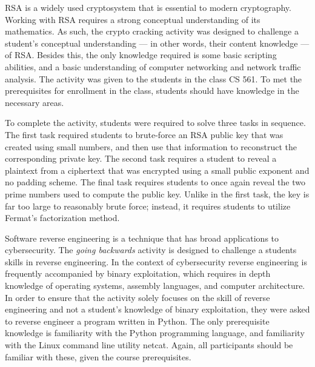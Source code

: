     RSA is a widely used cryptosystem that is essential to modern cryptography. 
    Working with RSA requires a strong conceptual understanding of its mathematics. 
    As such, the crypto cracking activity was designed to challenge a student's conceptual understanding --- 
    in other words, their content knowledge --- 
    of RSA. 
    Besides this, the only knowledge required is some basic scripting abilities, and a basic understanding of computer networking and network traffic analysis. 
    The activity was given to the students in the class CS 561. 
    To met the prerequisites for enrollment in the class, students should have knowledge in the necessary areas. 


    To complete the activity, students were required to solve three tasks in sequence. 
    The first task required students to brute-force an RSA public key that was created using small numbers, and then use that information to reconstruct the corresponding private key. 
    The second task requires a student to reveal a plaintext from a ciphertext that was encrypted using a small public exponent and no padding scheme. 
    The final task requires students to once again reveal the two prime numbers used to compute the public key. 
    Unlike in the first task, the key is far too large to reasonably brute force; 
    instead, it requires students to utilize Fermat's factorization method. 

    Software reverse engineering is a technique that has broad applications to cybersecurity. 
    The \emph{going backwards} activity is designed to challenge a students skills in reverse engineering. 
    In the context of cybersecurity reverse engineering is frequently accompanied by binary exploitation, which requires in depth knowledge of operating systems, assembly languages, and computer architecture. 
    In order to ensure that the activity solely focuses on the skill of reverse engineering and not a student's knowledge of binary exploitation, they were asked to reverse engineer a program written in Python. 
    The only prerequisite knowledge is familiarity with the Python programming language, and familiarity with the Linux command line utility netcat. 
    Again, all participants should be familiar with these, given the course prerequisites.

